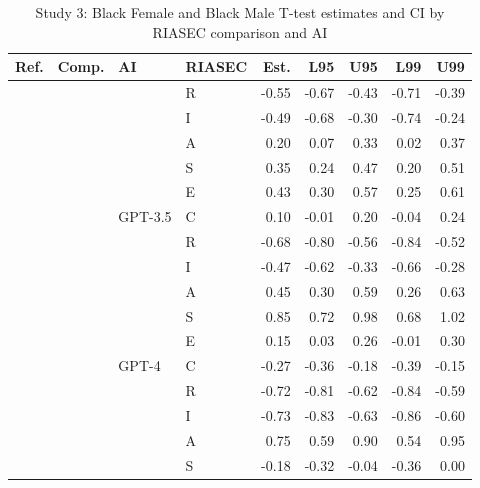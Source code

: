 \begin{table}

\caption{Study 3: Black Female and Black Male T-test estimates and CI by RIASEC comparison and AI}
\centering
\fontsize{8}{10}\selectfont
\begin{tabular}[t]{llllrrrrr}
\toprule
Ref. & Comp. & AI & RIASEC & Est. & L95 & U95 & L99 & U99\\
\midrule
 &  &  & R & -0.55 & -0.67 & -0.43 & -0.71 & -0.39\\

 &  &  & I & -0.49 & -0.68 & -0.30 & -0.74 & -0.24\\

 &  &  & A & 0.20 & 0.07 & 0.33 & 0.02 & 0.37\\

 &  &  & S & 0.35 & 0.24 & 0.47 & 0.20 & 0.51\\

 &  &  & E & 0.43 & 0.30 & 0.57 & 0.25 & 0.61\\

 &  & \multirow[t]{-6}{*}{\raggedright\arraybackslash GPT-3.5} & C & 0.10 & -0.01 & 0.20 & -0.04 & 0.24\\

 &  &  & R & -0.68 & -0.80 & -0.56 & -0.84 & -0.52\\

 &  &  & I & -0.47 & -0.62 & -0.33 & -0.66 & -0.28\\

 &  &  & A & 0.45 & 0.30 & 0.59 & 0.26 & 0.63\\

 &  &  & S & 0.85 & 0.72 & 0.98 & 0.68 & 1.02\\

 &  &  & E & 0.15 & 0.03 & 0.26 & -0.01 & 0.30\\

 &  & \multirow[t]{-6}{*}{\raggedright\arraybackslash GPT-4} & C & -0.27 & -0.36 & -0.18 & -0.39 & -0.15\\

 &  &  & R & -0.72 & -0.81 & -0.62 & -0.84 & -0.59\\

 &  &  & I & -0.73 & -0.83 & -0.63 & -0.86 & -0.60\\

 &  &  & A & 0.75 & 0.59 & 0.90 & 0.54 & 0.95\\

 &  &  & S & -0.18 & -0.32 & -0.04 & -0.36 & 0.00\\


\end{tabular}
\end{table}
